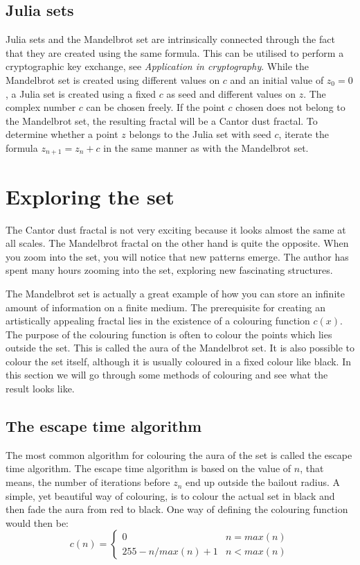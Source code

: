 \documentclass{article}
\begin{document}
\subsection{Julia sets}
Julia sets and the Mandelbrot set are intrinsically connected through the fact that they are created using the same formula. This can be utilised to perform a cryptographic key exchange, see \textit{Application in cryptography}. While the Mandelbrot set is created using different values on $c$ and an initial value of $z_{0}=0$, a Julia set is created using a fixed $c$ as seed and different values on $z$. The complex number $c$ can be chosen freely\cite{alia&samsudin}.
If the point $c$ chosen does not belong to the Mandelbrot set, the resulting fractal will be a Cantor dust fractal. To determine whether a point $z$ belongs to the Julia set with seed $c$, iterate the formula $z_{n+1}=z_{n}+c$ in the same manner as with the Mandelbrot set.
\section{Exploring the set}
The Cantor dust fractal is not very exciting because it looks almost the same at all scales. The Mandelbrot fractal on the other hand is quite the opposite. When you zoom into the set, you will notice that new patterns emerge. The author has spent many hours zooming into the set, exploring new fascinating structures. 

The Mandelbrot set is actually a great example of how you can store an infinite amount of information on a finite medium. The prerequisite for creating an artistically appealing fractal lies in the existence of a colouring function $c(x)$. The purpose of the colouring function is often to colour the points which lies outside the set. This is called the aura of the Mandelbrot set. It is also possible to colour the set itself, although it is usually coloured in a fixed colour like black. In this section we will go through some methods of colouring and see what the result looks like.
\subsection{The escape time algorithm}
The most common algorithm for colouring the aura of the set is called the escape time algorithm. The escape time algorithm is based on the value of $n$, that means, the number of iterations before $z_{n}$ end up outside the bailout radius. A simple, yet beautiful way of colouring, is to colour the actual set in black and then fade the aura from red to black. One way of defining the colouring function would then be:
\[
c(n) = \begin{cases}
0 & n = max(n) \\
255 - n / max(n) + 1 & n < max(n)
\end{cases}
\]
\end{document}
